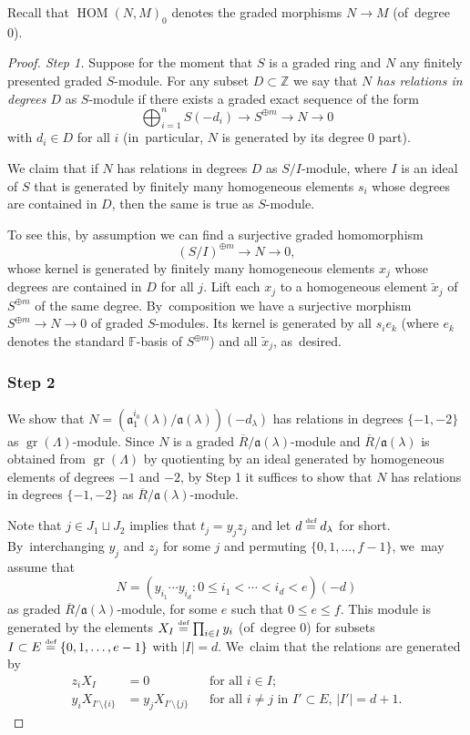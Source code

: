 \documentclass[JEP,XML,SOM,Unicode,NoFloatCountersInSection, NoEqCountersInSection,published]{cedram}
\let\wt\widetilde
\let\ovl\overline
\newcommand{\defeq}{\stackrel{\textrm{\tiny{\upshape{def}}}}{=}}
\newcommand{\F}{\mathbb{F}}
\newcommand{\Z}{{\mathbb Z}}
\DeclareMathOperator{\gr}{gr}
\DeclareMathOperator{\HOM}{HOM}
\theoremstyle{plain}
\theoremstyle{definition}
\begin{document}
Recall that $\HOM(N,M)_0$ denotes the graded morphisms $N \to M$ (of~degree 0).

\begin{proof}[Proof. Step 1]
Suppose for the moment that $S$ is a graded ring and $N$ any finitely presented graded $S$-module.
For any subset $D \subset \Z$ we say that \emph{$N$ has relations in degrees $D$} as $S$-module if there exists a graded exact sequence of the form
\[
\bigoplus_{i=1}^n S(-d_i) \to S^{\oplus m} \to N \to 0
\]
with $d_i \in D$ for all $i$ (in~particular, $N$ is generated by its degree 0 part).

We claim that if $N$ has relations in degrees $D$ as $S/I$-module, where $I$ is an ideal of $S$ that is generated by finitely many homogeneous elements $s_i$ whose degrees are contained in $D$, then the same is true as $S$-module.

To see this, by assumption we can find a surjective graded homomorphism
\[
(S/I)^{\oplus m} \to N\to 0,
\]
whose kernel is generated by finitely many homogeneous elements $x_j$ whose degrees are contained in $D$ for all $j$.
Lift each $x_j$ to a homogeneous element $\wt x_j$ of $S^{\oplus m}$ of the same degree. By~composition we have a surjective morphism $S^{\oplus m} \to N \to 0$ of graded $S$-modules.
Its kernel is generated by all $s_i e_k$ (where $e_k$ denotes the standard $\F$-basis of $S^{\oplus m}$) and all $\wt x_j$, as~desired.

\subsubsection*{Step 2}
We show that $N = (\mathfrak{a}_1^{i_0}(\lambda)/\mathfrak{a}(\lambda))(-d_\lambda)$ has relations in degrees $\{-1,-2\}$ as $\gr(\Lambda)$-module.
Since $N$ is a graded $\ovl R/\mathfrak{a}(\lambda)$-module and $\ovl R/\mathfrak{a}(\lambda)$ is obtained from $\gr(\Lambda)$ by quotienting by an ideal generated by homogeneous elements of degrees $-1$ and $-2$, by Step 1 it suffices to show that $N$ has relations in degrees $\{-1,-2\}$ as $\ovl R/\mathfrak{a}(\lambda)$-module.

Note that $j \in J_1 \sqcup J_2$ implies that $t_j = y_jz_j$ and let $d \defeq d_\lambda$ for short. By~interchanging $y_j$ and $z_j$ for some $j$ and permuting $\{0,1,\dots,f-1\}$, we~may assume that
\[
N = (y_{i_1}\cdots y_{i_d}: 0 \le i_1 < \cdots < i_d < e)(-d)
\]
as graded $\ovl R/\mathfrak{a}(\lambda)$-module, for some $e$ such that $0 \le e \le f$.
This module is generated by the elements $X_I \defeq \prod_{i \in I} y_i$ (of~degree 0) for subsets $I \subset E \defeq \{0,1,\dots,e-1\}$ with $|I| = d$. We~claim that the relations are generated by
\begin{equation}\label{eq:relations}
\begin{aligned}
z_i X_I &= 0 && \text{for all $i \in I$}; \\
y_i X_{I'\setminus \{i\}} &= y_j X_{I'\setminus \{j\}} && \text{for all $i \ne j$ in $I' \subset E$, $|I'| = d+1$}.
\end{aligned}
\end{equation}


\end{proof}
\end{document}
